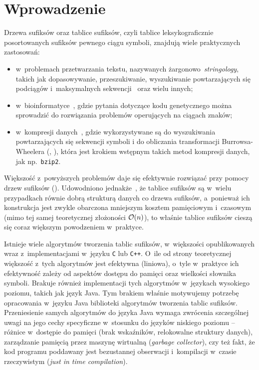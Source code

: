\chapter{Wprowadzenie}


Drzewa sufiksów oraz tablice sufiksów, czyli tablice leksykograficznie posortowanych sufiksów pewnego
ciągu symboli, znajdują wiele praktycznych zastosowań:

\begin{itemize}
    \item w~problemach przetwarzania tekstu, nazywanych żargonowo~\emph{stringology}, takich
    jak dopasowywanie, przeszukiwanie, wyszukiwanie powtarzających się podciągów 
    i~maksymalnych sekwencji~\cite{Manber90, gusfield} oraz
    wielu innych;

    \item w~bioinformatyce~\cite{abouelhoda-genome}, gdzie
    pytania dotyczące kodu genetycznego można sprowadzić do rozwiązania problemów operujących 
    na ciągach znaków;

    \item w~kompresji danych~\cite{BW}, gdzie wykorzystywane są do wyszukiwania powtarzających
    się sekwencji symboli i do obliczania transformacji Burrowsa-Wheelera 
    (, ), która jest krokiem wstępnym
    takich metod kompresji danych, jak np.~\texttt{bzip2}.
\end{itemize}

Większość z~powyższych problemów daje się efektywnie rozwiązać przy pomocy 
drzew sufiksów (). Udowodniono jednakże~\cite{replacing},
że tablice sufiksów są w~wielu przypadkach równie dobrą strukturą danych co drzewa sufiksów, 
a~ponieważ ich konstrukcja jest zwykle obarczona
mniejszym kosztem pamięciowym i~czasowym (mimo tej samej teoretycznej
złożoności $\mathcal{O}(n)$), to właśnie tablice sufiksów cieszą się coraz większym
powodzeniem w~praktyce.

Istnieje wiele algorytmów tworzenia tablic sufiksów, w~większości opublikowanych wraz z~implementacjami
w~języku \texttt{C} lub \texttt{C++}. O~ile od strony teoretycznej
większość z~tych algorytmów jest efektywna (liniowa), o~tyle w~praktyce ich efektywność zależy od aspektów
dostępu do pamięci oraz wielkości słownika symboli. Brakuje również
implementacji tych algorytmów w~językach wysokiego poziomu, takich jak język Java. 
Tym brakiem właśnie motywujemy potrzebę opracowania w~języku Java biblioteki algorytmów tworzenia 
tablic sufiksów. Przeniesienie samych algorytmów do języka Java wymaga zwrócenia szczególnej uwagi na
jego cechy specyficzne w~stosunku do języków niskiego poziomu -- różnice w~dostępie do pamięci 
(brak wskaźników, relokowalne struktury danych), zarządzanie pamięcią przez maszynę
wirtualną (\emph{garbage collector}), czy też fakt, że kod programu poddawany jest bezustannej obserwacji
i~kompilacji w~czasie rzeczywistym (\emph{just in time compilation}).


